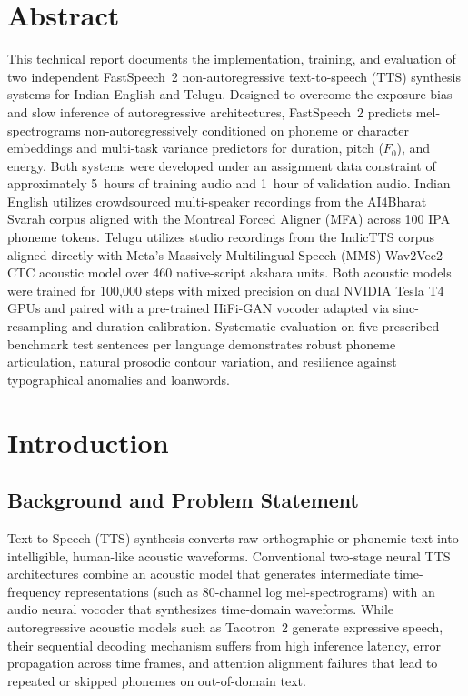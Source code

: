 \documentclass[11pt,a4paper]{report}
\begin{document}
\chapter*{Abstract}
This technical report documents the implementation, training, and evaluation of two independent FastSpeech~2 non-autoregressive text-to-speech (TTS) synthesis systems for Indian English and Telugu. Designed to overcome the exposure bias and slow inference of autoregressive architectures, FastSpeech~2 predicts mel-spectrograms non-autoregressively conditioned on phoneme or character embeddings and multi-task variance predictors for duration, pitch ($F_0$), and energy. Both systems were developed under an assignment data constraint of approximately 5~hours of training audio and 1~hour of validation audio. Indian English utilizes crowdsourced multi-speaker recordings from the AI4Bharat Svarah corpus aligned with the Montreal Forced Aligner (MFA) across 100 IPA phoneme tokens. Telugu utilizes studio recordings from the IndicTTS corpus aligned directly with Meta's Massively Multilingual Speech (MMS) Wav2Vec2-CTC acoustic model over 460 native-script akshara units. Both acoustic models were trained for 100{,}000 steps with mixed precision on dual NVIDIA Tesla T4 GPUs and paired with a pre-trained HiFi-GAN vocoder adapted via sinc-resampling and duration calibration. Systematic evaluation on five prescribed benchmark test sentences per language demonstrates robust phoneme articulation, natural prosodic contour variation, and resilience against typographical anomalies and loanwords.

\clearpage
\setcounter{tocdepth}{2}
\tableofcontents
\clearpage\FloatBarrier
{}

\chapter{Introduction}

\section{Background and Problem Statement}
Text-to-Speech (TTS) synthesis converts raw orthographic or phonemic text into intelligible, human-like acoustic waveforms. Conventional two-stage neural TTS architectures combine an acoustic model that generates intermediate time-frequency representations (such as 80-channel log mel-spectrograms) with an audio neural vocoder that synthesizes time-domain waveforms. While autoregressive acoustic models such as Tacotron~2 generate expressive speech, their sequential decoding mechanism suffers from high inference latency, error propagation across time frames, and attention alignment failures that lead to repeated or skipped phonemes on out-of-domain text.
\end{document}
